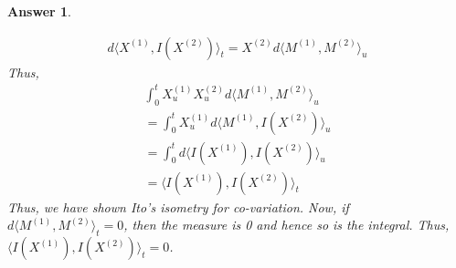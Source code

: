 \documentclass[12pt]{article}
\theoremstyle{colon}
\newtheorem*{answer}{Answer}
\begin{document}
\begin{answer}
\begin{enumerate}[label=\alph*)]
      \begin{gather*}
        d \langle X^{(1)}, I(X^{(2)}) \rangle_t = X^{(2)} d \langle M^{(1)}, M^{(2)} \rangle_u
      \end{gather*}
      Thus,
      \begin{gather*}
        \int_0^t X_u^{(1)} X_u^{(2)} d \langle M^{(1)}, M^{(2)} \rangle_u \\
        = \int_0^t X_u^{(1)} d \langle M^{(1)}, I(X^{(2)}) \rangle_u \\
        = \int_0^t d \langle I(X^{(1)}), I(X^{(2)}) \rangle_u \\
        = \langle I(X^{(1)}), I(X^{(2)}) \rangle_t
      \end{gather*}
      Thus, we have shown Ito's isometry for co-variation. Now, if \\ $d \langle M^{(1)}, M^{(2)} \rangle_t = 0$, then the measure is 0 and hence so is the integral. Thus, $\langle I(X^{(1)}), I(X^{(2)}) \rangle_t = 0$.


\end{enumerate}
\end{answer}
\end{document}
